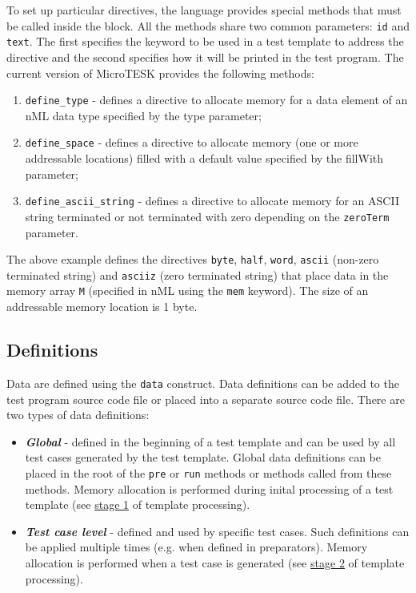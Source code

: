 \documentclass[oneside,final,12pt]{extreport}
\begin{document}
To set up particular directives, the language provides special methods that must
be called inside the block. All the methods share two common parameters:
\texttt{id} and \texttt{text}. The first specifies the keyword to be used in a
test template to address the directive and the second specifies how it will be
printed in the test program. The current version of MicroTESK provides the following methods:

\begin{enumerate}
  \item \texttt{define{\_}type} - defines a directive to allocate memory for a data element
        of an nML data type specified by the type parameter;

  \item \texttt{define{\_}space} - defines a directive to allocate memory (one or more
        addressable locations) filled with a default value specified by the
        fillWith parameter;

  \item \texttt{define{\_}ascii{\_}string} - defines a directive to allocate memory for an
        ASCII string terminated or not terminated with zero depending on the
        \texttt{zeroTerm} parameter.
\end{enumerate}

The above example defines the directives \texttt{byte}, \texttt{half}, \texttt{word},
\texttt{ascii} (non-zero terminated string) and \texttt{asciiz} (zero terminated string)
that place data in the memory array \texttt{M} (specified in nML using the \texttt{mem} keyword).
The size of an addressable memory location is 1 byte.

\subsection{Definitions}

Data are defined using the \texttt{data} construct. Data definitions can be added to the test
program source code file or placed into a separate source code file. There are two types of
data definitions:

\begin{itemize}
\item \textbf{\textit{Global}} - defined in the beginning of a test template and can be used by
      all test cases generated by the test template. Global data definitions can be placed in
      the root of the \texttt{pre} or \texttt{run} methods or methods called from these methods.
      Memory allocation is performed during inital processing of a test template (see
      \hyperref[ttp_stage_1]{stage 1} of template processing).

\item \textbf{\textit{Test case level}} - defined and used by specific test cases. Such definitions
      can be applied multiple times (e.g. when defined in preparators).
      Memory allocation is performed when a test case is generated (see
      \hyperref[ttp_stage_2]{stage 2} of template processing).
\end{itemize}
\end{document}

